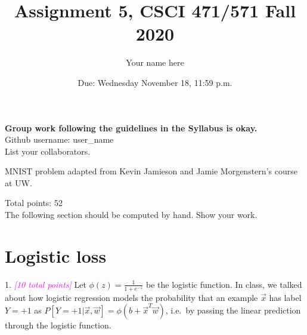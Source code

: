 \documentclass{article}
\title{Assignment 5, CSCI 471/571 Fall 2020}
\date{Due: Wednesday November 18, 11:59 p.m.}
\author{Your name here}
\newcommand{\points}[1]{\small\textcolor{magenta}{\emph{[#1 points]}} \normalsize}
\begin{document}
\maketitle

{\bf Group work following the guidelines in the Syllabus is okay.}\\
Github username: user\_name\\
List your collaborators.

MNIST problem adapted from Kevin Jamieson and Jamie Morgenstern's course at UW.

\vspace{1em}
Total points: 52\\

\vspace{1em}
The following section should be computed by hand. Show your work.
\section*{Logistic loss}
1. \points{10 total} Let $\phi(z) = \frac{1}{1 + e^{-z}}$ be the logistic function.
In class, we talked about how logistic regression models
the probability that an example $\vec x$ has label $Y = +1$ as
$P[Y = +1 | \vec x, \vec w] = \phi(b + \vec x^T \vec w)$,
i.e.\ by passing the linear prediction through the logistic function.
\end{document}
